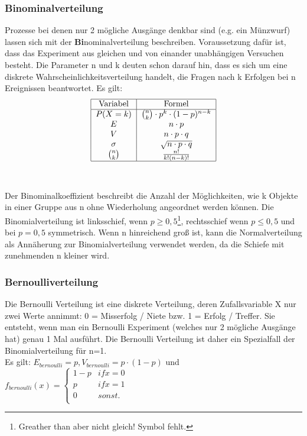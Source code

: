 \documentclass[letterpaper, titlepage]{article}
\begin{document}
\subsubsection{Binominalverteilung}\label{Binominalverteilung}
Prozesse bei denen nur 2 mögliche Ausgänge denkbar sind (e.g. ein Münzwurf) lassen sich mit der \textbf{Bi}nominalverteilung beschreiben. Voraussetzung dafür ist, dass das Experiment aus gleichen und von einander unabhängigen Versuchen besteht. Die Parameter n und k deuten schon darauf hin, dass es sich um eine diskrete Wahrscheinlichkeitsverteilung handelt, die Fragen nach k Erfolgen bei n Ereignissen beantwortet. Es gilt: 
\\
\begin{align}
    \begin{tabular}{|c|c|}
        \hline
        Variabel & Formel \\
        \hline
        $P(X=k)$ & $\binom{n}{k} \cdot p^k \cdot (1-p)^{n-k}$ \\
        $E$ & $n \cdot p$ \\
        $V$ & $n \cdot p \cdot q$ \\
        $\sigma$ & $\sqrt{n \cdot p \cdot q}$ \\
        $\binom{n}{k}$ & $\frac{n!}{k!(n-k)!}$ \\
        \hline
    \end{tabular}
\end{align}
\\
\\
Der Binominalkoeffizient beschreibt die Anzahl der Möglichkeiten, wie k Objekte in einer Gruppe aus n ohne Wiederholung angeordnet werden können. Die Binomialverteilung ist linksschief, wenn $p \geq 0,5$\footnote{Greather than aber nicht gleich! Symbol fehlt.}, rechtsschief wenn $p \leq 0,5$ und bei $p = 0,5$ symmetrisch. Wenn n hinreichend groß ist, kann die Normalverteilung als Annäherung zur Binomialverteilung verwendet werden, da die Schiefe mit zunehmenden n kleiner wird.

\subsubsection{Bernoulliverteilung}\label{Bernoulli}
Die Bernoulli Verteilung ist eine diskrete Verteilung, deren Zufallsvariable X nur zwei Werte annimmt: 0 = Misserfolg / Niete bzw. 1 = Erfolg / Treffer. Sie entsteht, wenn man ein Bernoulli Experiment (welches nur 2 mögliche Ausgänge hat) genau 1 Mal ausführt. Die Bernoulli Verteilung ist daher ein Spezialfall der Binomialverteilung für n=1. 
\\
Es gilt: $E_{bernoulli}=p, V_{bernoulli}=p\cdot (1-p)$ 
und $f_{bernoulli}(x)=\begin{cases}
    1-p & {if x=0} \\
    p & {if x=1} \\
    0 & {sonst.} \\
\end{cases}$
\end{document}

